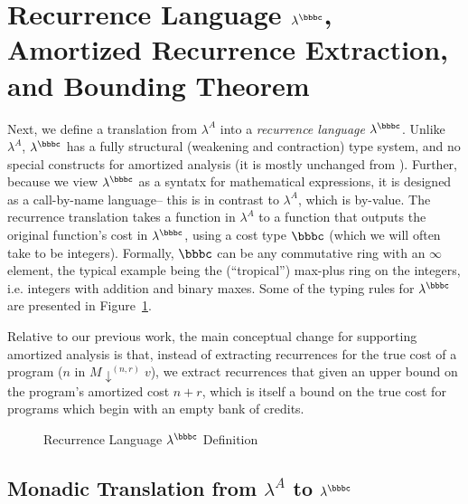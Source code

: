 \section{Recurrence Language \texorpdfstring{$\lambda^\bbbc$}{}, Amortized Recurrence Extraction, and Bounding Theorem} \label{sec:cl}

Next, we define a translation from $\lambda^A$ into a \emph{recurrence
  language} $\lambda^{\bbbc}$. Unlike $\lambda^A$, $\lambda^{\bbbc}$ has
a fully structural (weakening and contraction) type system, and no
special constructs for amortized analysis (it is mostly unchanged from
\cite{danner-et-al:icfp15,hudson}). Further, because we view $\lambda^\bbbc$
as a syntatx for mathematical expressions, it is designed as a call-by-name language--
this is in contrast to $\lambda^A$, which is by-value.
The recurrence translation takes a function in
$\lambda^A$ to a function that outputs the original function's cost in
$\lambda^\bbbc$, using a cost type $\bbbc$ (which we will often
take to be integers).  Formally, $\bbbc$ can be any commutative ring
with an $\infty$ element, the typical example being the (``tropical'')
max-plus ring on the integers, i.e. integers with addition and binary
maxes.  Some of the typing rules for $\lambda^\bbbc$ are presented in
Figure~\ref{fig:lc-rules}.

Relative to our previous work, the main conceptual change for supporting
amortized analysis is that, instead of extracting recurrences for the
true cost of a program ($n$ in $M \downarrow^{(n,r)} v$), we extract
recurrences that given an upper bound on the program's amortized cost $n
+ r$, which is itself a bound on the true cost for programs which begin
with an empty bank of credits.

\begin{figure}[h]
  
  \vspace{-0.25in}
  \caption{Recurrence Language $\lambda^\bbbc$ Definition}
  \label{fig:lc-rules}
\end{figure}

\subsection{Monadic Translation from \texorpdfstring{$\lambda^A$}{intermediate
language} to \texorpdfstring{$\lambda^\bbbc$}{recurrence language}}\label{ssec:mt}
\label{sec:monadic-translation}

